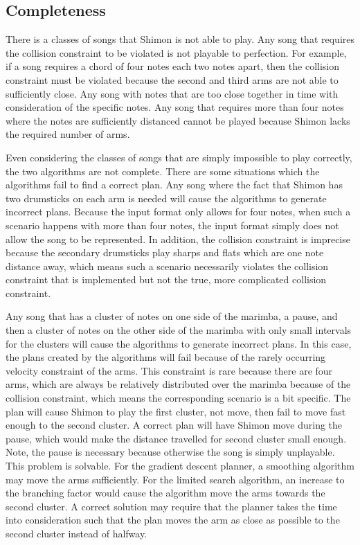 \documentclass[letterpaper, 10 pt, conference]{ieeeconf}  %
\begin{document}
\subsection{Completeness}

There is a classes of songs that Shimon is not able to play. Any song that requires the collision constraint to be violated is not playable to perfection. For example, if a song requires a chord of four notes each two notes apart, then the collision constraint must be violated because the second and third arms are not able to sufficiently close. Any song with notes that are too close together in time with consideration of the specific notes. Any song that requires more than four notes where the notes are sufficiently distanced cannot be played because Shimon lacks the required number of arms. 

Even considering the classes of songs that are simply impossible to play correctly, the two algorithms are not complete. There are some situations which the algorithms fail to find a correct plan. Any song where the fact that Shimon has two drumsticks on each arm is needed will cause the algorithms to generate incorrect plans. Because the input format only allows for four notes, when such a scenario happens with more than four notes, the input format simply does not allow the song to be represented. In addition, the collision constraint is imprecise because the secondary drumsticks play sharps and flats which are one note distance away, which means such a scenario necessarily violates the collision constraint that is implemented but not the true, more complicated collision constraint. 

Any song that has a cluster of notes on one side of the marimba, a pause, and then a cluster of notes on the other side of the marimba with only small intervals for the clusters will cause the algorithms to generate incorrect plans. In this case, the plans created by the algorithms will fail because of the rarely occurring velocity constraint of the arms. This constraint is rare because there are four arms, which are always be relatively distributed over the marimba because of the collision constraint, which means the corresponding scenario is a bit specific. The plan will cause Shimon to play the first cluster, not move, then fail to move fast enough to the second cluster. A correct plan will have Shimon move during the pause, which would make the distance travelled for second cluster small enough. Note, the pause is necessary because otherwise the song is simply unplayable. This problem is solvable. For the gradient descent planner, a smoothing algorithm may move the arms sufficiently. For the limited search algorithm, an increase to the branching factor would cause the algorithm move the arms towards the second cluster. A correct solution may require that the planner takes the time into consideration such that the plan moves the arm as close as possible to the second cluster instead of halfway.
\end{document}
